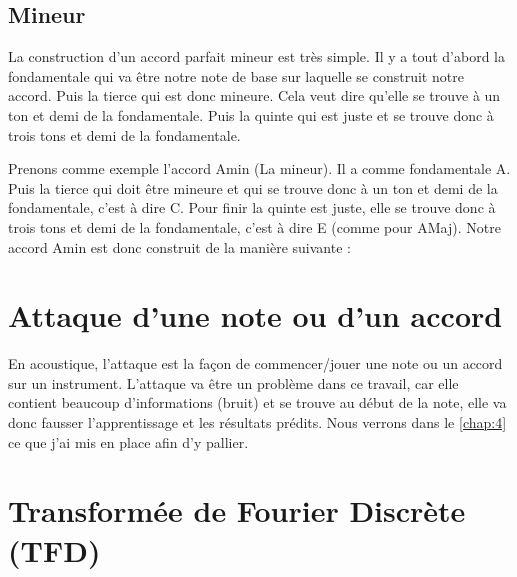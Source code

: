 \subsection{Mineur}

La construction d'un accord parfait mineur est très simple. Il y a tout d'abord la fondamentale qui va être notre note de base sur laquelle se construit notre accord. Puis la tierce qui est donc mineure. Cela veut dire qu'elle se trouve à un ton et demi de la fondamentale. Puis la quinte qui est juste et se trouve donc à trois tons et demi de la fondamentale.

Prenons comme exemple l'accord Amin (La mineur). Il a comme fondamentale A. Puis la tierce qui doit être mineure et qui se trouve donc à un ton et demi de la fondamentale, c'est à dire C. Pour finir la quinte est juste, elle se trouve donc à trois tons et demi de la fondamentale, c'est à dire E (comme pour AMaj). Notre accord Amin est donc construit de la manière suivante :

\begin{table}[H]
\end{table}

\section{Attaque d'une note ou d'un accord}
\label{sec:2.4}

En acoustique, l'attaque est la façon de commencer/jouer une note ou un accord sur un instrument. L'attaque va être un problème dans ce travail, car elle contient beaucoup d'informations (bruit) et se trouve au début de la note, elle va donc fausser l'apprentissage et les résultats prédits. Nous verrons dans le \autoref{chap:4} ce que j'ai mis en place afin d'y pallier.

\section{Transformée de Fourier Discrète (TFD)}
\label{sec:2.5}


